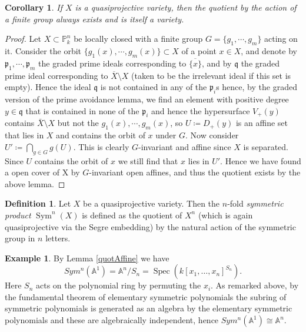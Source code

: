 \documentclass[11pt, a4paper, german, twoside]{article}
\theoremstyle{plain}
\newtheorem{corollary}[theorem]{Corollary}
\theoremstyle{definition}
\newtheorem{definition}[theorem]{Definition}
\newtheorem{example}[theorem]{Example}
\DeclareMathOperator{\Spec}{Spec}
\DeclareMathOperator{\Sym}{Sym}
\begin{document}
\begin{corollary}
    If $X$ is a quasiprojective variety, then the quotient by the action of a finite group always exists and is itself a variety.
\end{corollary}
\begin{proof}
    Let $X \subset \mathbb{P}_k^n$ be locally closed with a finite group $G = \{g_1,\cdots,g_m\}$ acting on it. 
    Consider the orbit $\{g_1(x),\cdots,g_m(x)\} \subset X$ of a point $x \in X$, and denote by $\mathfrak{p}_1,\cdots,\mathfrak{p}_m$ the 
    graded prime ideals corresponding to $\overline{\{x\}}$, and by $\mathfrak{q}$ the graded prime ideal corresponding to
    $\overline{X} \setminus X$ (taken to be the irrelevant ideal if this set is empty). 
    Hence the ideal $\mathfrak{q}$ is not contained in any of the $\mathfrak{p}_i$s hence, by the graded version of the prime
    avoidance lemma, we find an element with positive degree $y \in \mathfrak{q}$ that is contained in none of the $\mathfrak{p}_i$ and hence
    the hypersurface $V_+(y)$ contains $\bar{X} \setminus X$ but not the $g_1(x),\cdots,g_m(x)$, so $U \coloneqq D_+(y)$ 
    is an affine set that lies in $X$ and contains the orbit of $x$ under $G$. Now consider $U' \coloneqq \bigcap_{g \in G} g(U)$. 
    This is clearly $G$-invariant and affine since $X$ is separated. 
    Since $U$ contains the orbit of $x$ we still find that $x$ lies in $U'$. Hence we have found a open cover of X by
    $G$-invariant open affines, and thus the quotient exists by the above lemma.
\end{proof}

\begin{definition}
    \label{symdef}
    Let $X$ be a quasiprojective variety. Then the $n$-fold \emph{symmetric product} $\Sym^n(X)$ is defined as the quotient of $X^n$
    (which is again quasiprojective via the Segre embedding) by the natural action of the symmetric group in $n$ letters.
\end{definition}

\begin{example}
    By Lemma \ref{quotAffine} we have 
    \[
        Sym^n(\mathbb{A}^1) = \mathbb{A}^n/S_n = \Spec(k[x_1,\dots,x_n]^{S_n}).
    \]
    Here $S_n$ acts on the
    polynomial ring by permuting the $x_i$. As remarked above, by the fundamental theorem of elementary symmetric polynomials the subring
    of symmetric polynomials is generated as an algebra by the elementary symmetric polynomials and these are algebraically independent, hence
    $Sym^n(\mathbb{A}^1) \cong \mathbb{A}^n$.
\end{example}
\end{document}
